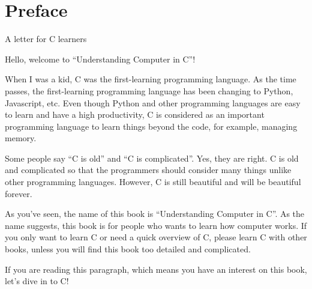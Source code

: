 \chapter*{Preface}

A letter for C learners

\clearpage

Hello, welcome to ``Understanding Computer in C''!

When I was a kid, C was the first-learning programming language. As the
time passes, the first-learning programming language has been changing to
Python, Javascript, etc. Even though Python and other programming
languages are easy to learn and have a high productivity, C is considered
as an important programming language to learn things beyond the code, for
example, managing memory.

Some people say ``C is old'' and ``C is complicated''. Yes, they are
right. C is old and complicated so that the programmers should consider
many things unlike other programming languages. However, C is still
beautiful and will be beautiful forever.

As you've seen, the name of this book is ``Understanding Computer in C''.
As the name suggests, this book is for people who wants to learn how
computer works. If you only want to learn C or need a quick overview of C,
please learn C with other books, unless you will find this book too
detailed and complicated.

If you are reading this paragraph, which means you have an interest on
this book, let's dive in to C!

\clearpage
